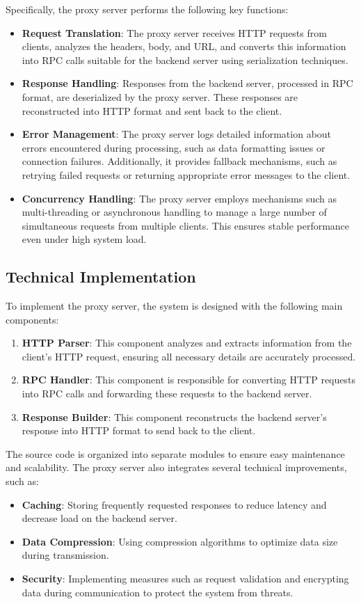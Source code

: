 \documentclass{article}
\begin{document}
Specifically, the proxy server performs the following key functions:
\begin{itemize}
\item \textbf{Request Translation}: The proxy server receives HTTP requests from clients, analyzes the headers, body, and URL, and converts this information into RPC calls suitable for the backend server using serialization techniques.
\item \textbf{Response Handling}: Responses from the backend server, processed in RPC format, are deserialized by the proxy server. These responses are reconstructed into HTTP format and sent back to the client.
\item \textbf{Error Management}: The proxy server logs detailed information about errors encountered during processing, such as data formatting issues or connection failures. Additionally, it provides fallback mechanisms, such as retrying failed requests or returning appropriate error messages to the client.
\item \textbf{Concurrency Handling}: The proxy server employs mechanisms such as multi-threading or asynchronous handling to manage a large number of simultaneous requests from multiple clients. This ensures stable performance even under high system load.
\end{itemize}

\subsection{Technical Implementation}
To implement the proxy server, the system is designed with the following main components:
\begin{enumerate}
\item \textbf{HTTP Parser}: This component analyzes and extracts information from the client's HTTP request, ensuring all necessary details are accurately processed.
\item \textbf{RPC Handler}: This component is responsible for converting HTTP requests into RPC calls and forwarding these requests to the backend server.
\item \textbf{Response Builder}: This component reconstructs the backend server's response into HTTP format to send back to the client.
\end{enumerate}

The source code is organized into separate modules to ensure easy maintenance and scalability. The proxy server also integrates several technical improvements, such as:
\begin{itemize}
\item \textbf{Caching}: Storing frequently requested responses to reduce latency and decrease load on the backend server.
\item \textbf{Data Compression}: Using compression algorithms to optimize data size during transmission.
\item \textbf{Security}: Implementing measures such as request validation and encrypting data during communication to protect the system from threats.
\end{itemize}
\end{document}
